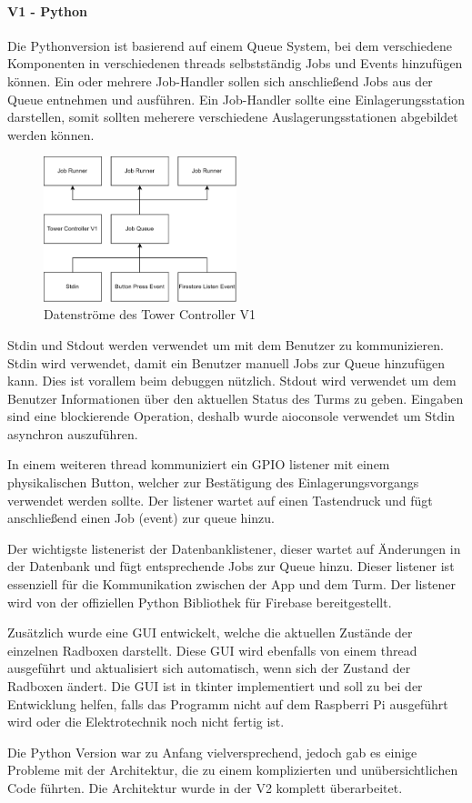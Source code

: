 \paragraph{V1 - Python}
Die Pythonversion ist basierend auf einem Queue System, bei dem verschiedene Komponenten in verschiedenen \Glspl{thread} selbstständig Jobs und Events hinzufügen können. Ein oder mehrere Job-Handler sollen sich anschließend Jobs aus der Queue entnehmen und ausführen. Ein Job-Handler sollte eine Einlagerungsstation darstellen, somit sollten meherere verschiedene Auslagerungsstationen abgebildet werden können.

\begin{figure}[H]
  \centering
  \includegraphics[width=0.5\textwidth]{images/tower_controller_v1.png}
  \caption{Datenströme des Tower Controller V1}
  \label{fig:tower_controller_v1}
\end{figure}

\ac{Stdin} und \ac{Stdout} werden verwendet um mit dem Benutzer zu kommunizieren. \ac{Stdin} wird verwendet, damit ein Benutzer manuell Jobs zur Queue hinzufügen kann. Dies ist vorallem beim \Gls{debuggen} nützlich. \ac{Stdout} wird verwendet um dem Benutzer Informationen über den aktuellen Status des Turms zu geben. Eingaben sind eine blockierende Operation, deshalb wurde aioconsole verwendet um \ac{Stdin} asynchron auszuführen.

In einem weiteren \Gls{thread} kommuniziert ein \ac{GPIO} \Gls{listener} mit einem physikalischen Button, welcher zur Bestätigung des Einlagerungsvorgangs verwendet werden sollte. Der \Gls{listener} wartet auf einen Tastendruck und fügt anschließend einen Job (\Gls{event}) zur \Gls{queue} hinzu.

Der wichtigste \Gls{listener}ist der Datenbanklistener, dieser wartet auf Änderungen in der Datenbank und fügt entsprechende Jobs zur Queue hinzu. Dieser \Gls{listener} ist essenziell für die Kommunikation zwischen der App und dem Turm. Der \Gls{listener} wird von der offiziellen Python Bibliothek für Firebase bereitgestellt.

Zusätzlich wurde eine \ac{GUI} entwickelt, welche die aktuellen Zustände der einzelnen Radboxen darstellt. Diese \ac{GUI} wird ebenfalls von einem \Gls{thread} ausgeführt und aktualisiert sich automatisch, wenn sich der Zustand der Radboxen ändert. Die \ac{GUI} ist in tkinter implementiert und soll zu bei der Entwicklung helfen, falls das Programm nicht auf dem Raspberri Pi ausgeführt wird oder die Elektrotechnik noch nicht fertig ist.

Die Python Version war zu Anfang vielversprechend, jedoch gab es einige Probleme mit der Architektur, die zu einem komplizierten und unübersichtlichen Code führten. Die Architektur wurde in der V2 komplett überarbeitet.
